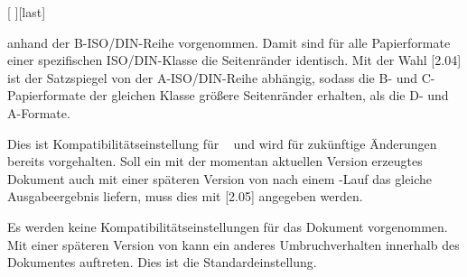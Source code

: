 \begin{Declaration*}{}
\begin{Declaration*}{}
\begin{Declaration*}{}
\begin{Declaration}[v2.03]{[%
  \textOR{}\textOR{}%
]}[last]
\begin{values}
  anhand der B-ISO/DIN-Reihe vorgenommen. Damit sind für alle Papierformate 
  einer spezifischen ISO/DIN-Klasse die Seitenränder identisch. Mit der Wahl 
  [2.04] ist der Satzspiegel von der A-ISO/DIN-Reihe 
  abhängig, sodass die B- und C-Papierformate der gleichen Klasse größere 
  Seitenränder erhalten, als die D- und A-Formate.
\item[\PValue{2.05}]
  Dies ist Kompatibilitätseinstellung für \TUDScript~\vTUDScript{} und wird für 
  zukünftige Änderungen bereits vorgehalten. Soll ein mit der momentan 
  aktuellen Version erzeugtes Dokument auch mit einer späteren Version von 
  \TUDScript nach einem -Lauf das gleiche Ausgabeergebnis 
  liefern, muss dies mit [2.05] angegeben werden.
\item[\PValue{last}]
  Es werden keine Kompatibilitätseinstellungen für das Dokument vorgenommen. 
  Mit einer späteren Version von \TUDScript kann ein anderes Umbruchverhalten 
  innerhalb des Dokumentes auftreten. Dies ist die Standardeinstellung.
\end{values}
\end{Declaration}
\end{Declaration*}
\end{Declaration*}
\end{Declaration*}
